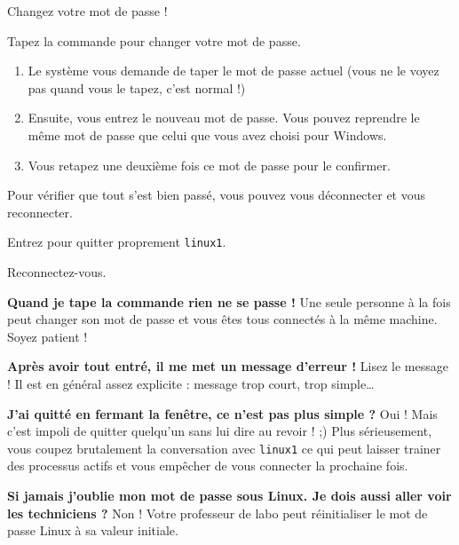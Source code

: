 \documentclass[a4paper,11pt]{style-esi/td}
\begin{document}
		\begin{Tutoriel}{Changez votre mot de passe !}
			\vspace{-1em}
			\begin{steps}
			\item Tapez la commande  pour changer votre mot de passe.
				\begin{enumerate}				
					\item 
						Le système vous demande de taper le mot de passe actuel 
						(vous ne le voyez pas quand vous le tapez, c'est normal !)
					\item 
						Ensuite, vous entrez le nouveau mot de passe.
						Vous pouvez reprendre le même mot de passe 
						que celui que vous avez choisi pour Windows.
					\item 
						Vous retapez une deuxième fois ce mot de passe pour le confirmer.
				\end{enumerate}
			\end{steps}
			Pour vérifier que tout s'est bien passé, 
			vous pouvez vous déconnecter et vous reconnecter.
			\begin{steps}
			\item Entrez  pour quitter proprement \verb_linux1_.
			\item Reconnectez-vous. 
			\end{steps}
		\end{Tutoriel}
			
		\bigskip
		\begin{faq}
			\textbf{Quand je tape la commande rien ne se passe !}
				Une seule personne à la fois peut changer son mot de passe 
				et vous êtes tous connectés à la même machine. 
				Soyez patient !

			\medskip	
			\textbf{Après avoir tout entré, il me met un message d'erreur !}
				Lisez le message ! Il est en général assez explicite : 
				message trop court, trop simple\dots

			\medskip
			\textbf{J'ai quitté en fermant la fenêtre, ce n'est pas plus simple ?}
				Oui ! Mais c'est impoli de quitter quelqu'un sans lui dire au revoir ! ;) 
				Plus sérieusement, vous coupez brutalement la conversation avec \texttt{linux1} 
				ce qui peut laisser trainer des processus actifs et vous empêcher de vous connecter la prochaine fois.

			\medskip
			\textbf{Si jamais j'oublie mon mot de passe sous Linux. Je dois aussi aller voir les techniciens ?}			
				Non ! Votre professeur de labo peut réinitialiser le mot de passe Linux à sa valeur initiale.
		\end{faq}
				
\end{document}
